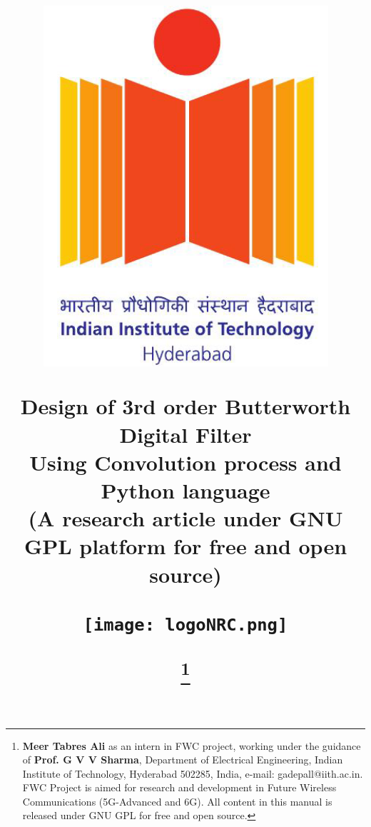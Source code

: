 \documentclass[journal,10pt,twocolumn]{article}
\begin{document}

\let\vec\mathbf


\title{
{\begin{minipage}{0.13\linewidth}
\includegraphics[width=\linewidth]{logoIITH.png}
\end{minipage}\hfill 
\begin{minipage}{0.7\linewidth}
\centering \Large \bfseries 
Design of 3rd order Butterworth Digital Filter\\
Using Convolution process and Python language \\
\vskip5mm
{\small (A research article under GNU GPL platform for free and open source)}
\end{minipage}\hfill 
\begin{minipage}{0.13\linewidth}
\texttt{[image: logoNRC.png]}
\end{minipage}\hfill }


\thanks{\textbf{Meer Tabres Ali} as an intern in FWC project, working under the guidance of \textbf{Prof. G V V Sharma}, Department of Electrical Engineering, Indian Institute of Technology, Hyderabad 502285, India, e-mail: gadepall@iith.ac.in. FWC Project is aimed for research and development in Future Wireless Communications (5G-Advanced and 6G). All content in this manual is released under GNU GPL for free and open source.}}
\end{document}

